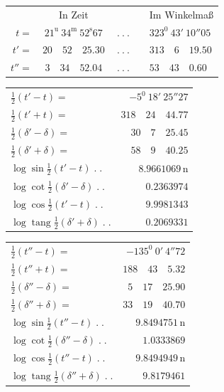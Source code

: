 \begin{center}\small
\begin{tabular}{rcrcl}
&In Zeit&&&Im Winkelmaß\\
$t=$&$21^{\mathrm u}\ 34^{\mathrm m}\ 52^{\mathrm s}67$&$\ .\ .\ .$&&$323^0\ 43'\ 10''05$\\
$t'=$&$20\quad52\quad25.30$&$\ .\ .\ .$&&$313\quad6\quad19.50$\\
$t''=$&$3\quad34\quad52.04$&$\ .\ .\ .$&&$53\quad43\quad0.60$
\end{tabular}
\par\medskip
\begin{minipage}[t]{.49\textwidth}\centering
\begin{tabular}[t]{@{}lr@{}}
$\tfrac12(t'-t)=$&$-5^0\ 18'\ 25''27$\\
$\tfrac12(t'+t)=$&$318\quad24\quad44.77$\\[6pt]
$\tfrac12(\delta'-\delta)=$&$30\quad7\quad25.45$\\
$\tfrac12(\delta'+\delta)=$&$58\quad9\quad40.25$\\[6pt]
$\log\sin\tfrac12(t'-t)\;.\;.$&$8.9661069\,\mathrm n$\\
$\log\cot\tfrac12(\delta'-\delta)\;.\;.$&$0.2363974$\\[6pt]
$\log\cos\tfrac12(t'-t)\;.\;.$&$9.9981343$\\
$\log\operatorname{tang}\tfrac12(\delta'+\delta)\;.\;.$&$0.2069331$
\end{tabular}
\end{minipage}\hfill
\begin{minipage}[t]{.49\textwidth}\centering
\begin{tabular}[t]{@{}lr@{}}
$\tfrac12(t''-t)=$&$-135^0\ 0'\ 4''72$\\
$\tfrac12(t''+t)=$&$188\quad43\quad5.32$\\[6pt]
$\tfrac12(\delta''-\delta)=$&$5\quad17\quad25.90$\\
$\tfrac12(\delta''+\delta)=$&$33\quad19\quad40.70$\\[6pt]
$\log\sin\tfrac12(t''-t)\;.\;.$&$9.8494751\,\mathrm n$\\
$\log\cot\tfrac12(\delta''-\delta)\;.\;.$&$1.0333869$\\[6pt]
$\log\cos\tfrac12(t''-t)\;.\;.$&$9.8494949\,\mathrm n$\\
$\log\operatorname{tang}\tfrac12(\delta''+\delta)\;.\;.$&$9.8179461$
\end{tabular}
\end{minipage}
\end{center}
